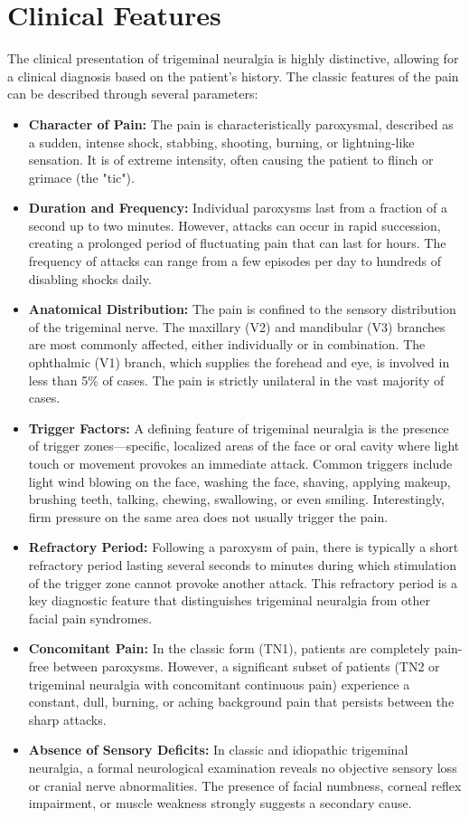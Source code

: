 \section*{Clinical Features}
The clinical presentation of trigeminal neuralgia is highly distinctive, allowing for a clinical diagnosis based on the patient's history. The classic features of the pain can be described through several parameters:
\begin{itemize}
  \item \textbf{Character of Pain:} The pain is characteristically paroxysmal, described as a sudden, intense shock, stabbing, shooting, burning, or lightning-like sensation. It is of extreme intensity, often causing the patient to flinch or grimace (the "tic").
  \item \textbf{Duration and Frequency:} Individual paroxysms last from a fraction of a second up to two minutes. However, attacks can occur in rapid succession, creating a prolonged period of fluctuating pain that can last for hours. The frequency of attacks can range from a few episodes per day to hundreds of disabling shocks daily.
  \item \textbf{Anatomical Distribution:} The pain is confined to the sensory distribution of the trigeminal nerve. The maxillary (V2) and mandibular (V3) branches are most commonly affected, either individually or in combination. The ophthalmic (V1) branch, which supplies the forehead and eye, is involved in less than 5\% of cases. The pain is strictly unilateral in the vast majority of cases.
  \item \textbf{Trigger Factors:} A defining feature of trigeminal neuralgia is the presence of trigger zones—specific, localized areas of the face or oral cavity where light touch or movement provokes an immediate attack. Common triggers include light wind blowing on the face, washing the face, shaving, applying makeup, brushing teeth, talking, chewing, swallowing, or even smiling. Interestingly, firm pressure on the same area does not usually trigger the pain.
  \item \textbf{Refractory Period:} Following a paroxysm of pain, there is typically a short refractory period lasting several seconds to minutes during which stimulation of the trigger zone cannot provoke another attack. This refractory period is a key diagnostic feature that distinguishes trigeminal neuralgia from other facial pain syndromes.
  \item \textbf{Concomitant Pain:} In the classic form (TN1), patients are completely pain-free between paroxysms. However, a significant subset of patients (TN2 or trigeminal neuralgia with concomitant continuous pain) experience a constant, dull, burning, or aching background pain that persists between the sharp attacks.
  \item \textbf{Absence of Sensory Deficits:} In classic and idiopathic trigeminal neuralgia, a formal neurological examination reveals no objective sensory loss or cranial nerve abnormalities. The presence of facial numbness, corneal reflex impairment, or muscle weakness strongly suggests a secondary cause.
\end{itemize}


